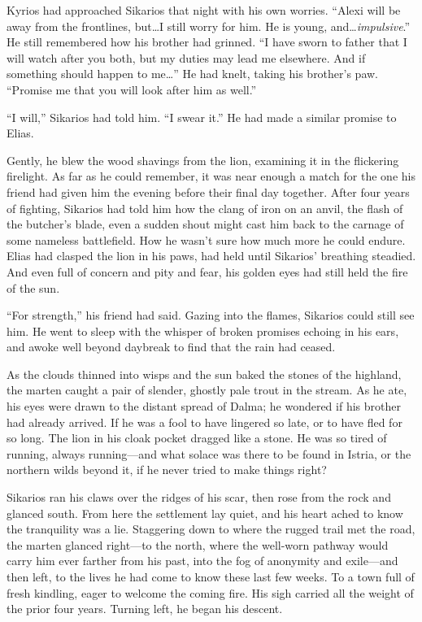 Kyrios had approached Sikarios that night with his own worries. ``Alexi will be away from the frontlines, but\ldots{}I still worry for him. He is young, and\ldots{}\emph{impulsive}.'' He still remembered how his brother had grinned. ``I have sworn to father that I will watch after you both, but my duties may lead me elsewhere. And if something should happen to me\ldots'' He had knelt, taking his brother's paw. ``Promise me that you will look after him as well.''

``I will,'' Sikarios had told him. ``I swear it.'' He had made a similar promise to Elias.

Gently, he blew the wood shavings from the lion, examining it in the flickering firelight. As far as he could remember, it was near enough a match for the one his friend had given him the evening before their final day together. After four years of fighting, Sikarios had told him how the clang of iron on an anvil, the flash of the butcher's blade, even a sudden shout might cast him back to the carnage of some nameless battlefield. How he wasn't sure how much more he could endure. Elias had clasped the lion in his paws, had held until Sikarios' breathing steadied. And even full of concern and pity and fear, his golden eyes had still held the fire of the sun.

``For strength,'' his friend had said. Gazing into the flames, Sikarios could still see him. He went to sleep with the whisper of broken promises echoing in his ears, and awoke well beyond daybreak to find that the rain had ceased.

As the clouds thinned into wisps and the sun baked the stones of the highland, the marten caught a pair of slender, ghostly pale trout in the stream. As he ate, his eyes were drawn to the distant spread of Dalma; he wondered if his brother had already arrived. If he was a fool to have lingered so late, or to have fled for so long. The lion in his cloak pocket dragged like a stone. He was so tired of running, always running---and what solace was there to be found in Istria, or the northern wilds beyond it, if he never tried to make things right?

Sikarios ran his claws over the ridges of his scar, then rose from the rock and glanced south. From here the settlement lay quiet, and his heart ached to know the tranquility was a lie. Staggering down to where the rugged trail met the road, the marten glanced right---to the north, where the well-worn pathway would carry him ever farther from his past, into the fog of anonymity and exile---and then left, to the lives he had come to know these last few weeks. To a town full of fresh kindling, eager to welcome the coming fire. His sigh carried all the weight of the prior four years. Turning left, he began his descent.

